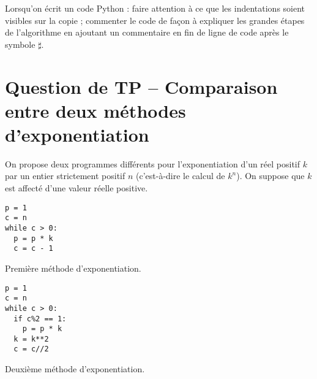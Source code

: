 
\parindent=10pt
\textheight 250mm

  \pagestyle{fancy}



 \begin{center}
  \begin{large}
  \end{large}
 \end{center}

\begin{boxedminipage}{\textwidth} 
Lorsqu'on écrit un code Python : faire attention à ce que les indentations soient visibles sur la copie ; commenter le code de façon à expliquer les grandes étapes de l'algorithme en ajoutant un commentaire en fin de ligne de code après le symbole $\sharp$.
\end{boxedminipage}
 

\section{Question de TP -- Comparaison entre deux méthodes d'exponentiation}
\label{sec:ComparaisonExponentiation}

On propose deux programmes différents pour l'exponentiation d'un réel positif $k$ par un entier strictement positif $n$ (c'est-à-dire le calcul de $k^n$). On suppose que $k$ est affecté d'une valeur réelle positive.

\begin{listing}
\begin{verbatim}
p = 1
c = n
while c > 0:
  p = p * k
  c = c - 1
\end{verbatim}
\caption{Première méthode d'exponentiation.}
\label{prog:exponentiationnaive}
\end{listing}

\begin{listing}
\begin{verbatim}
p = 1
c = n
while c > 0:
  if c%2 == 1:
    p = p * k
  k = k**2  
  c = c//2
\end{verbatim}
\caption{Deuxième méthode d'exponentiation.}
\label{prog:exponentiationrapide}
\end{listing}

